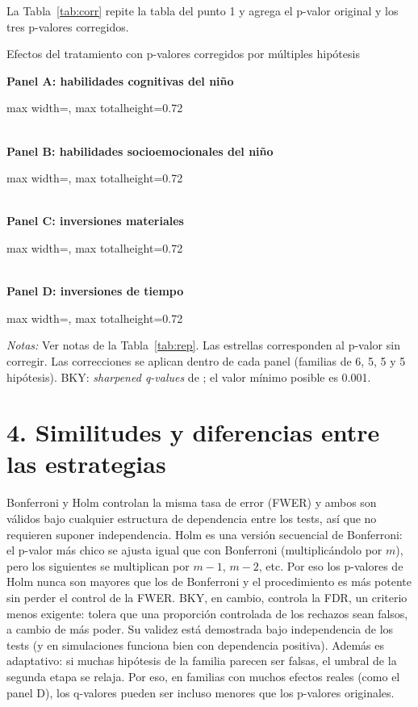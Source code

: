 \documentclass[11pt,a4paper]{article}
\newcommand{\tabla}[1]{\begin{adjustbox}{max width=\linewidth, max totalheight=0.72\textheight}\end{adjustbox}}
\newcommand{\notas}[1]{\par\vspace{0.3em}\begin{minipage}{0.92\linewidth}\footnotesize\textit{Notas:} #1\end{minipage}}
\begin{document}
La Tabla~\ref{tab:corr} repite la tabla del punto 1 y agrega el p-valor original y los tres p-valores corregidos.

\begin{table}[H]\centering
\caption{Efectos del tratamiento con p-valores corregidos por múltiples hipótesis}\label{tab:corr}
\small
\textbf{Panel A: habilidades cognitivas del niño}\\[0.2em]
\tabla{"../output/Tabla 2 - Panel A.tex"}\\[0.8em]
\textbf{Panel B: habilidades socioemocionales del niño}\\[0.2em]
\tabla{"../output/Tabla 2 - Panel B.tex"}\\[0.8em]
\textbf{Panel C: inversiones materiales}\\[0.2em]
\tabla{"../output/Tabla 2 - Panel C.tex"}\\[0.8em]
\textbf{Panel D: inversiones de tiempo}\\[0.2em]
\tabla{"../output/Tabla 2 - Panel D.tex"}
\notas{Ver notas de la Tabla~\ref{tab:rep}. Las estrellas corresponden al p-valor sin corregir. Las correcciones se aplican dentro de cada panel (familias de 6, 5, 5 y 5 hipótesis). BKY: \textit{sharpened q-values} de \citet{anderson}; el valor mínimo posible es 0.001.}
\end{table}

\section*{4. Similitudes y diferencias entre las estrategias}

Bonferroni y Holm controlan la misma tasa de error (FWER) y ambos son válidos bajo cualquier estructura de dependencia entre los tests, así que no requieren suponer independencia. Holm es una versión secuencial de Bonferroni: el p-valor más chico se ajusta igual que con Bonferroni (multiplicándolo por $m$), pero los siguientes se multiplican por $m-1$, $m-2$, etc. Por eso los p-valores de Holm nunca son mayores que los de Bonferroni y el procedimiento es más potente sin perder el control de la FWER. BKY, en cambio, controla la FDR, un criterio menos exigente: tolera que una proporción controlada de los rechazos sean falsos, a cambio de más poder. Su validez está demostrada bajo independencia de los tests (y en simulaciones funciona bien con dependencia positiva). Además es adaptativo: si muchas hipótesis de la familia parecen ser falsas, el umbral de la segunda etapa se relaja. Por eso, en familias con muchos efectos reales (como el panel D), los q-valores pueden ser incluso menores que los p-valores originales.
\end{document}
